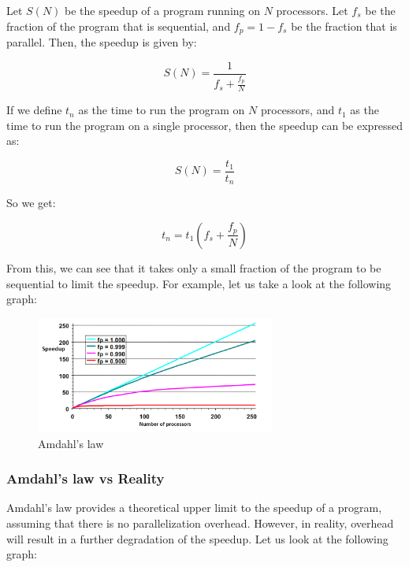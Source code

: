 \begin{law}
    Let $S(N)$ be the speedup of a program running on $N$ processors. Let $f_s$ be the fraction
    of the program that is sequential, and $f_p = 1 - f_s$ be the fraction that is parallel.
    Then, the speedup is given by:

    \begin{equation}
        S(N) = \frac{1}{f_s + \frac{f_p}{N}}
    \end{equation}

    If we define $t_n$ as the time to run the program on $N$ processors, and $t_1$ as the time
    to run the program on a single processor, then the speedup can be expressed as:

    \begin{equation}
        S(N) = \frac{t_1}{t_n}
    \end{equation}

    So we get:

    \begin{equation}
        t_n = t_1 \left( f_s + \frac{f_p}{N} \right)
    \end{equation}
\end{law}

From this, we can see that it takes only a small fraction of the program to be sequential
to limit the speedup. For example, let us take a look at the following graph:

\begin{figure}[H]
    \centering
    \includegraphics[width=0.7\textwidth]{figures/amdahl.png}
    \caption{Amdahl's law}
    \label{fig:amdahl}
\end{figure}

\subsubsection{Amdahl's law vs Reality}

Amdahl's law provides a theoretical upper limit to the speedup of a program, assuming 
that there is no parallelization overhead. However, in reality, overhead will result
in a further degradation of the speedup. Let us look at the following graph:

